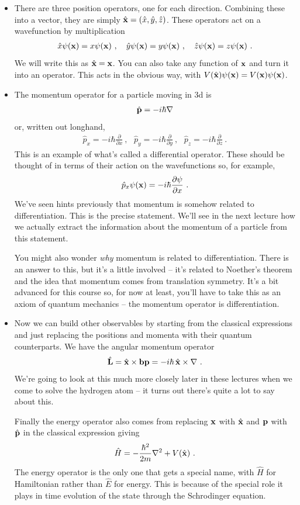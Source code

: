 \documentclass[12pt]{article}
\def\be{\begin{eqnarray}}
\def\ee{\end{eqnarray}}
\newcommand{\ppp}[2]{\frac{\partial {#1}}{\partial {#2}}}
\newcommand{\co}{\color{olive}}
\newcommand{\bx}{{\bf x}}
\newcommand{\bp}{{\bf p}}
\begin{document}
{%
\begin{itemize}
\item {\co There are three position operators, one for each direction. Combining these into a vector, they are  simply $\hat{\bx} = (\hat{x},\hat{y},\hat{z})$. These operators act on a wavefunction by multiplication
%
\be \hat{x} \psi(\bx) = x\psi(\bx)\ ,\ \ \ \hat{y}\psi(\bx) = y\psi(\bx)\ ,\ \ \ \hat{z}\psi(\bx) = z\psi(\bx)\ .\ee
% 
We will write this as $\hat{\bx}=\bx$. You can also take any function of $\bx$ and turn it into an operator. This acts in the obvious way, with $V(\hat{\bx})\psi(\bx) = V(\bx)\psi(\bx)$.}  \vskip 3mm
%
\item  {\co The momentum operator for a particle moving in 3d is
%
\be \hat{\bp} = -i\hbar \nabla\ee
%
or, written out longhand,
%
\be \hat{p}_x = -i\hbar\ppp{}{x}\ ,\ \ \ \hat{p}_y = -i\hbar\ppp{}{y}\ ,\ \ \ \hat{p}_z = -i\hbar\ppp{}{z}\ .\ee
%
} This is an example of what's called a differential operator. 
{\co These should be thought of in terms of their action on the wavefunctions so, for example,
%
\be \hat{p}_x\psi(\bx) = -i\hbar\ppp{\psi}{x}\ .\ee
%
} We've seen hints previously that momentum is somehow related to differentiation. This is the precise statement. We'll see in the next lecture how we actually extract the information about the momentum of a particle from this statement.

You might also wonder {\it why} momentum is related to differentiation. There is an answer to this, but it's a little involved -- it's related to Noether's theorem and the idea that momentum comes from translation symmetry. It's a bit advanced for this course so, for now at least, you'll have to take this as an axiom of quantum mechanics -- the momentum operator is differentiation.

\vskip 2mm\item Now we can build other observables by starting from the classical expressions and just replacing the positions and momenta with their quantum counterparts. {\co We have the angular momentum operator
%
\be \hat{\bf L} =  \hat{\bx} \times {\bf bp} = -i\hbar \,\hat{\bx} \times \nabla\ .\ee
%
} We're going to look at this much more closely later in these lectures when we come to solve the hydrogen atom -- it turns out there's quite a lot to say about this. 

{\co Finally the energy operator also comes from replacing $\bx$ with $\hat{\bx}$ and $\bp$ with $\hat{\bp}$ in the classical expression giving
%
\be \hat{H}  = -\frac{\hbar^2}{2m}\nabla^2 + V(\hat{\bx})\ .\label{hampoland}\ee
%
The energy operator is the only one that gets a special name, with $\hat{H}$ for Hamiltonian rather than $\hat{E}$ for energy.} This is because of the special role it plays in time evolution of the state through the Schrodinger equation. 
\end{itemize}
%

}
\end{document}
